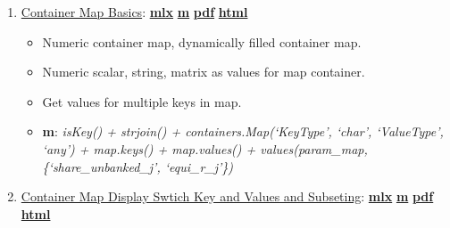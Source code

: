 \documentclass[
]{book}
\providecommand{\tightlist}{%
  \setlength{\itemsep}{0pt}\setlength{\parskip}{0pt}}
\begin{document}
\begin{enumerate}
\def\labelenumi{\arabic{enumi}.}
\tightlist
\item
  \href{https://fanwangecon.github.io/M4Econ/amto/container/htmlpdfm/fs_container.html}{Container Map Basics}: \href{https://github.com/FanWangEcon/M4Econ/blob/master/amto/container/fs_container.mlx}{\textbf{mlx}} \textbar{} \href{https://github.com/FanWangEcon/M4Econ/blob/master/amto/container/htmlpdfm/fs_container.m}{\textbf{m}} \textbar{} \href{https://github.com/FanWangEcon/M4Econ/blob/master/amto/container/htmlpdfm/fs_container.pdf}{\textbf{pdf}} \textbar{} \href{https://fanwangecon.github.io/M4Econ/amto/container/htmlpdfm/fs_container.html}{\textbf{html}}

  \begin{itemize}
  \tightlist
  \item
    Numeric container map, dynamically filled container map.
  \item
    Numeric scalar, string, matrix as values for map container.
  \item
    Get values for multiple keys in map.
  \item
    \textbf{m}: \emph{isKey() + strjoin() + containers.Map(`KeyType', `char', `ValueType', `any') + map.keys() + map.values() + values(param\_map, \{`share\_unbanked\_j', `equi\_r\_j'\})}
  \end{itemize}
\item
  \href{https://fanwangecon.github.io/M4Econ/amto/container/htmlpdfm/fs_containermap.html}{Container Map Display Swtich Key and Values and Subseting}: \href{https://github.com/FanWangEcon/M4Econ/blob/master/amto/container/fs_containermap.mlx}{\textbf{mlx}} \textbar{} \href{https://github.com/FanWangEcon/M4Econ/blob/master/amto/container/htmlpdfm/fs_containermap.m}{\textbf{m}} \textbar{} \href{https://github.com/FanWangEcon/M4Econ/blob/master/amto/container/htmlpdfm/fs_containermap.pdf}{\textbf{pdf}} \textbar{} \href{https://fanwangecon.github.io/M4Econ/amto/container/htmlpdfm/fs_containermap.html}{\textbf{html}}


\end{enumerate}
\end{document}
